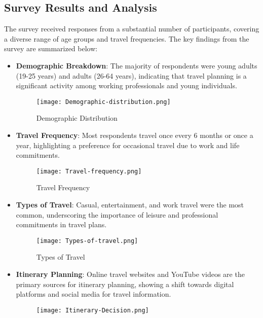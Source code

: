 \documentclass[conference]{IEEEtran}
\begin{document}
    \subsection{Survey Results and Analysis}
        The survey received responses from a substantial number of participants, covering a diverse range of age groups and travel frequencies. The key findings from the survey are summarized below:

        \begin{itemize}
            \item \textbf{Demographic Breakdown}: The majority of respondents were young adults (19-25 years) and adults (26-64 years), indicating that travel planning is a significant activity among working professionals and young individuals.
            \begin{figure}
                \centering
                \texttt{[image: Demographic-distribution.png]}
                \caption{Demographic Distribution}
                \label{fig:demographic-distribution}
            \end{figure}
            \item \textbf{Travel Frequency}: Most respondents travel once every 6 months or once a year, highlighting a preference for occasional travel due to work and life commitments.
            \begin{figure}
                \centering
                \texttt{[image: Travel-frequency.png]}
                \caption{Travel Frequency}
                \label{fig:travel-frequency}
            \end{figure}
            \item \textbf{Types of Travel}: Casual, entertainment, and work travel were the most common, underscoring the importance of leisure and professional commitments in travel plans.
            \begin{figure}
                \centering
                \texttt{[image: Types-of-travel.png]}
                \caption{Types of Travel}
                \label{fig:types-of-travel}
            \end{figure}
            \item \textbf{Itinerary Planning}: Online travel websites and YouTube videos are the primary sources for itinerary planning, showing a shift towards digital platforms and social media for travel information.
            \begin{figure}
                \centering
                \texttt{[image: Itinerary-Decision.png]}

\end{figure}
\end{itemize}
\end{document}
